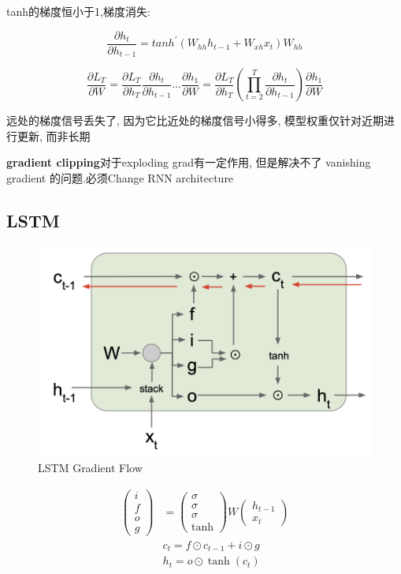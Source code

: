	tanh的梯度恒小于1,梯度消失:

	\[
		\frac{\partial h_t}{\partial h_{t-1}}=tanh^{\prime}(W_{hh}h_{t-1}+W_{xh}x_t)W_{hh}	
	\]

	\[
		\frac{\partial L_T}{\partial W}=\frac{\partial L_T}{\partial h_T}\frac{\partial h_t}{\partial h_{t-1}}\ldots\frac{\partial h_1}{\partial W}=\frac{\partial L_T}{\partial h_T}(\prod_{t=2}^T\frac{\partial h_t}{\partial h_{t-1}})\frac{\partial h_1}{\partial W}	
	\]

	远处的梯度信号丢失了, 因为它比近处的梯度信号小得多, 模型权重仅针对近期进行更新, 而非长期
	
	\textbf{gradient clipping}对于exploding grad有一定作用, 但是解决不了 vanishing gradient 的问题.必须Change RNN architecture
	
	\subsection{LSTM}

	\begin{figure}[H]
		\centering
		\includegraphics[scale=0.2]{figures/lstm_grad_flow.png}
		\caption{LSTM Gradient Flow}
	\end{figure}

	\[
	\begin{aligned}
		\begin{pmatrix}i\\f\\o\\g\end{pmatrix}& =\begin{pmatrix}\sigma\\\sigma\\\sigma\\\tanh\end{pmatrix}W\begin{pmatrix}h_{t-1}\\x_t\end{pmatrix}  \\
		&c_{t} =f\odot c_{t-1}+i\odot g  \\
		&h_{t} =o\odot\tanh(c_t) 
	\end{aligned}
	\]

